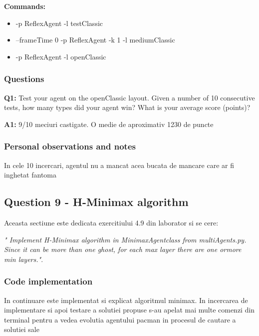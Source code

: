 \textbf{Commands:}
\begin{itemize}
    \setlength\itemsep{0em}
    \item -p ReflexAgent -l testClassic
    \item  --frameTime 0 -p ReflexAgent -k 1 -l mediumClassic
    \item -p ReflexAgent -l openClassic   
\end{itemize}

\subsubsection{Questions}

\textbf{Q1:} Test your agent on the openClassic layout. Given a number of 10 consecutive tests, how many types did your agent win? What is your average score (points)?

\textbf{A1:} 9/10 meciuri castigate. O medie de aproximativ 1230 de puncte


\subsubsection{Personal observations and notes}
In cele 10 incercari, agentul nu a mancat acea bucata de mancare care ar fi inghetat fantoma

\vspace{0.75cm}

\subsection{Question 9 - H-Minimax algorithm}
Aceasta sectiune este dedicata exercitiului 4.9 din laborator si se cere: \newline

\textit{" Implement H-Minimax algorithm in MinimaxAgentclass from multiAgents.py. Since it can be more  than one ghost, for each max layer there are one ormore min layers."}.


\subsubsection{Code implementation}
In continuare este implementat si explicat algoritmul minimax. In incercarea de implementare si apoi testare a solutiei propuse s-au apelat mai multe comenzi din terminal pentru a vedea evolutia agentului pacman in procesul de cautare a solutiei sale \newline \\

